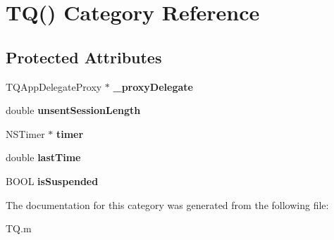 \hypertarget{category_t_q_07_08}{}\section{T\+Q() Category Reference}
\label{category_t_q_07_08}
\subsection*{Protected Attributes}
\begin{DoxyCompactItemize}
\item 
\hypertarget{category_t_q_07_08_af08a5ef76671d2500b31b37636c9803c}{}T\+Q\+App\+Delegate\+Proxy $\ast$ {\bfseries \+\_\+proxy\+Delegate}\label{category_t_q_07_08_af08a5ef76671d2500b31b37636c9803c}

\item 
\hypertarget{category_t_q_07_08_aa089f3f44f503078b0f07322641e9779}{}double {\bfseries unsent\+Session\+Length}\label{category_t_q_07_08_aa089f3f44f503078b0f07322641e9779}

\item 
\hypertarget{category_t_q_07_08_a8b3692c0912666dc015bacaa47c4119f}{}N\+S\+Timer $\ast$ {\bfseries timer}\label{category_t_q_07_08_a8b3692c0912666dc015bacaa47c4119f}

\item 
\hypertarget{category_t_q_07_08_a56ae20b439c4254040761c1364005eba}{}double {\bfseries last\+Time}\label{category_t_q_07_08_a56ae20b439c4254040761c1364005eba}

\item 
\hypertarget{category_t_q_07_08_a1805b83b9be1d506fc0b280feb885742}{}B\+O\+O\+L {\bfseries is\+Suspended}\label{category_t_q_07_08_a1805b83b9be1d506fc0b280feb885742}

\end{DoxyCompactItemize}


The documentation for this category was generated from the following file\+:\begin{DoxyCompactItemize}
\item 
T\+Q.\+m\end{DoxyCompactItemize}
